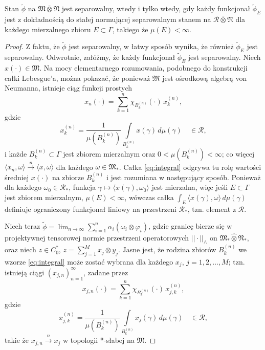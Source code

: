 \begin{Lemma}
Stan $\tilde{\phi}$ na $\mathfrak{M} \bar{\otimes} \mathfrak{N}$
jest separowalny, wtedy i tylko wtedy, gdy każdy funkcjonał $\tilde{\phi}_{E}$
jest z dokładnością do stałej normującej separowalnym stanem na
$\mathcal{R} \bar{\otimes} \mathfrak{N}$
dla każdego mierzalnego zbioru $E \subset \Gamma$,
takiego że $\mu(E) < \infty$.
\end{Lemma}
\begin{proof}
Z faktu, że $\tilde{\phi}$ jest separowalny, w łatwy sposób wynika, że również
$\tilde{\phi}_{E}$ jest separowalny.
Odwrotnie, załóżmy, że każdy funkcjonał $\tilde{\phi}_{E}$ jest separowalny.
Niech $x(\cdot) \in \mathfrak{M}$.
Na mocy elementarnego rozumowania,
podobnego do konstrukcji całki Lebesgue'a,
można pokazać, że ponieważ $\mathfrak{M}$ jest ośrodkową algebrą von Neumanna,
istnieje ciąg funkcji prostych
\begin{equation}
x_{n}(\cdot) =     \sum \limits_{k=1}^{n} \chi_{B_{k}^{(n)}}(\cdot)\, x_{k}^{(n)},
\end{equation}
gdzie
\begin{equation}
\label{eq:integral}
x_{k}^{(n)} = \frac{1}{\mu(B_{k}^{(n)})}
\int \limits_{B_{k}^{(n)}} x(\gamma) \, d\mu(\gamma)\quad \in \mathcal{R},
\end{equation}
i każde $B_{k}^{(n)} \subset \Gamma$ jest zbiorem mierzalnym oraz
$0< \mu(B_{k}^{(n)}) < \infty$;
co więcej $\langle x_{n}, \omega \rangle\stackrel{n}{\rightarrow}\langle x,
\omega \rangle$ dla każdego $\omega \in \mathfrak{M}_{*}$.
Całka \eqref{eq:integral} odgrywa tu rolę wartości średniej $x(\cdot)$
na zbiorze $B_{k}^{(n)}$ i jest rozumiana w następujący sposób.
Ponieważ dla każdego $\omega_{0} \in \mathcal{R}_{*}$,
funkcja $\gamma \mapsto \langle x(\gamma), \omega_{0} \rangle$
jest mierzalna, więc jeśli $E \subset \Gamma$ jest zbiorem mierzalnym,
$\mu(E) < \infty$,
wówczas całka $\int_{E} \langle x(\gamma), \omega \rangle \, d \mu(\gamma)$
definiuje ograniczony funkcjonał liniowy na przestrzeni $\mathcal{R}_{*}$,
tzn. element z $\mathcal{R}$.

Niech teraz $\tilde{\phi} =\lim_{n\to\infty}\sum_{i=1}^{n}\alpha_i(\omega_{i}\otimes\varphi_{i})$,
gdzie granicę bierze się w projektywnej tensorowej normie przestrzeni operatorowych
$|| \cdot ||_{\wedge}$ on $\mathfrak{M}_{*} \hat{\otimes} \mathfrak{N}_{*}$,
oraz niech $z \in C_{0}^{*}$, $z = \sum_{j=1}^{M} x_{j} \otimes y_{j}$.
Jasne jest, że rodzina zbiorów $B_{k}^{(n)}$ we wzorze \eqref{eq:integral}
może zostać wybrana dla każdego $x_{j}$, $j = 1,2, \ldots, M$; tzn.
istnieją ciągi $(x_{j,n})_{n=1}^{\infty}$, zadane przez
\begin{equation}
x_{j,n}(\cdot) =     \sum \limits_{k=1}^{n} \chi_{B_{k}^{(n)}}(\cdot)
\, x_{j,k}^{(n)},
\end{equation}
gdzie
\begin{equation}
\label{eq:integralxes}
x_{j,k}^{(n)} = \frac{1}{\mu(B_{k}^{(n)})}
\int \limits_{B_{k}^{(n)}} x_{j}(\gamma) \, d\mu(\gamma)
\quad \in \mathcal{R},
\end{equation}
takie że $x_{j,n} \stackrel{n}{\longrightarrow} x_{j}$
w topologii *-słabej na  $\mathfrak{M}$.


\end{proof}
